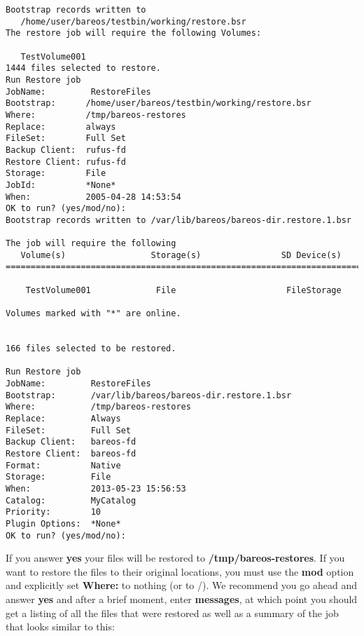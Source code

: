 \footnotesize
\begin{verbatim}
Bootstrap records written to
   /home/user/bareos/testbin/working/restore.bsr
The restore job will require the following Volumes:

   TestVolume001
1444 files selected to restore.
Run Restore job
JobName:         RestoreFiles
Bootstrap:      /home/user/bareos/testbin/working/restore.bsr
Where:          /tmp/bareos-restores
Replace:        always
FileSet:        Full Set
Backup Client:  rufus-fd
Restore Client: rufus-fd
Storage:        File
JobId:          *None*
When:           2005-04-28 14:53:54
OK to run? (yes/mod/no):
Bootstrap records written to /var/lib/bareos/bareos-dir.restore.1.bsr

The job will require the following
   Volume(s)                 Storage(s)                SD Device(s)
===========================================================================
   
    TestVolume001             File                      FileStorage              

Volumes marked with "*" are online.


166 files selected to be restored.

Run Restore job
JobName:         RestoreFiles
Bootstrap:       /var/lib/bareos/bareos-dir.restore.1.bsr
Where:           /tmp/bareos-restores
Replace:         Always
FileSet:         Full Set
Backup Client:   bareos-fd
Restore Client:  bareos-fd
Format:          Native
Storage:         File
When:            2013-05-23 15:56:53
Catalog:         MyCatalog
Priority:        10
Plugin Options:  *None*
OK to run? (yes/mod/no): 
\end{verbatim}
\normalsize

If you answer {\bf yes} your files will be restored to {\bf
/tmp/bareos-restores}. If you want to restore the files to their original
locations, you must use the {\bf mod} option and explicitly set {\bf Where:}
to nothing (or to /). We recommend you go ahead and answer {\bf yes} and after
a brief moment, enter {\bf messages}, at which point you should get a listing
of all the files that were restored as well as a summary of the job that looks
similar to this:

